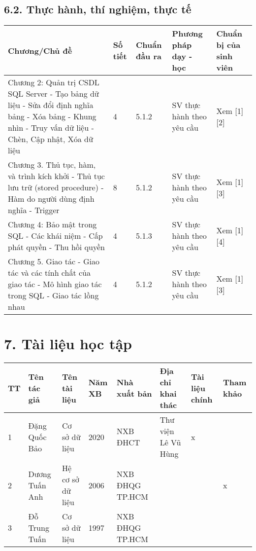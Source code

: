 \documentclass[a4paper,12pt]{article}
\begin{document}
\subsection*{6.2. Thực hành, thí nghiệm, thực tế}
\begin{longtable}{|p{4cm}|p{1.5cm}|p{2cm}|p{3cm}|p{3.5cm}|}
\hline
\textbf{Chương/Chủ đề} & \textbf{Số tiết} & \textbf{Chuẩn đầu ra} & \textbf{Phương pháp dạy - học} & \textbf{Chuẩn bị của sinh viên} \\
\hline
Chương 2: Quản trị CSDL SQL Server \newline - Tạo bảng dữ liệu \newline - Sửa đổi định nghĩa bảng \newline - Xóa bảng \newline - Khung nhìn \newline - Truy vấn dữ liệu \newline - Chèn, Cập nhật, Xóa dữ liệu & 4 & 5.1.2 & SV thực hành theo yêu cầu & Xem [1][2] \\
\hline
Chương 3. Thủ tục, hàm, và trình kích khởi \newline - Thủ tục lưu trữ (stored procedure) \newline - Hàm do người dùng định nghĩa \newline - Trigger & 8 & 5.1.2 & SV thực hành theo yêu cầu & Xem [1][3] \\
\hline
Chương 4: Bảo mật trong SQL \newline - Các khái niệm \newline - Cấp phát quyền \newline - Thu hồi quyền & 4 & 5.1.3 & SV thực hành theo yêu cầu & Xem [1][4] \\
\hline
Chương 5. Giao tác \newline - Giao tác và các tính chất của giao tác \newline - Mô hình giao tác trong SQL \newline - Giao tác lồng nhau & 4 & 5.1.2 & SV thực hành theo yêu cầu & Xem [1][3] \\
\hline
\end{longtable}

\section*{7. Tài liệu học tập}
\begin{longtable}{|p{0.5cm}|p{3cm}|p{4cm}|p{2cm}|p{3cm}|p{3cm}|p{1.5cm}|p{1.5cm}|}
\hline
\textbf{TT} & \textbf{Tên tác giả} & \textbf{Tên tài liệu} & \textbf{Năm XB} & \textbf{Nhà xuất bản} & \textbf{Địa chỉ khai thác} & \textbf{Tài liệu chính} & \textbf{Tham khảo} \\
\hline
1 & Đặng Quốc Bảo & Cơ sở dữ liệu & 2020 & NXB ĐHCT & Thư viện Lê Vũ Hùng & x & \\
\hline
2 & Dương Tuấn Anh & Hệ cơ sở dữ liệu & 2006 & NXB ĐHQG TP.HCM & & & x \\
\hline
3 & Đỗ Trung Tuấn & Cơ sở dữ liệu & 1997 & NXB ĐHQG TP.HCM & & & \\
\hline
\end{longtable}
\end{document}
